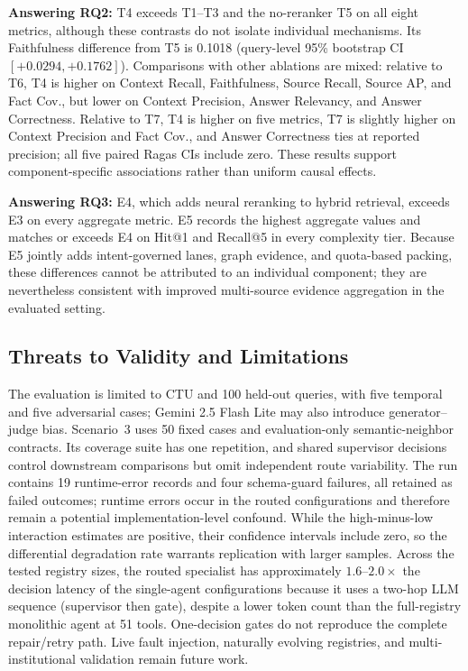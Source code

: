 \textbf{Answering RQ2:} T4 exceeds T1--T3 and the no-reranker T5 on all eight metrics, although these contrasts do not isolate individual mechanisms. Its Faithfulness difference from T5 is 0.1018 (query-level 95\% bootstrap CI $[+0.0294,+0.1762]$). Comparisons with other ablations are mixed: relative to T6, T4 is higher on Context Recall, Faithfulness, Source Recall, Source AP, and Fact Cov., but lower on Context Precision, Answer Relevancy, and Answer Correctness. Relative to T7, T4 is higher on five metrics, T7 is slightly higher on Context Precision and Fact Cov., and Answer Correctness ties at reported precision; all five paired Ragas CIs include zero. These results support component-specific associations rather than uniform causal effects.

\textbf{Answering RQ3:} E4, which adds neural reranking to hybrid retrieval, exceeds E3 on every aggregate metric. E5 records the highest aggregate values and matches or exceeds E4 on Hit@1 and Recall@5 in every complexity tier. Because E5 jointly adds intent-governed lanes, graph evidence, and quota-based packing, these differences cannot be attributed to an individual component; they are nevertheless consistent with improved multi-source evidence aggregation in the evaluated setting.

\subsection{Threats to Validity and Limitations}
\label{sec:limitations}

The evaluation is limited to CTU and 100 held-out queries, with five temporal and five adversarial cases; Gemini 2.5 Flash Lite may also introduce generator--judge bias. Scenario~3 uses 50 fixed cases and evaluation-only semantic-neighbor contracts. Its coverage suite has one repetition, and shared supervisor decisions control downstream comparisons but omit independent route variability. The run contains 19 runtime-error records and four schema-guard failures, all retained as failed outcomes; runtime errors occur in the routed configurations and therefore remain a potential implementation-level confound. While the high-minus-low interaction estimates are positive, their confidence intervals include zero, so the differential degradation rate warrants replication with larger samples. Across the tested registry sizes, the routed specialist has approximately $1.6$--$2.0\times$ the decision latency of the single-agent configurations because it uses a two-hop LLM sequence (supervisor then gate), despite a lower token count than the full-registry monolithic agent at 51 tools. One-decision gates do not reproduce the complete repair/retry path. Live fault injection, naturally evolving registries, and multi-institutional validation remain future work.
